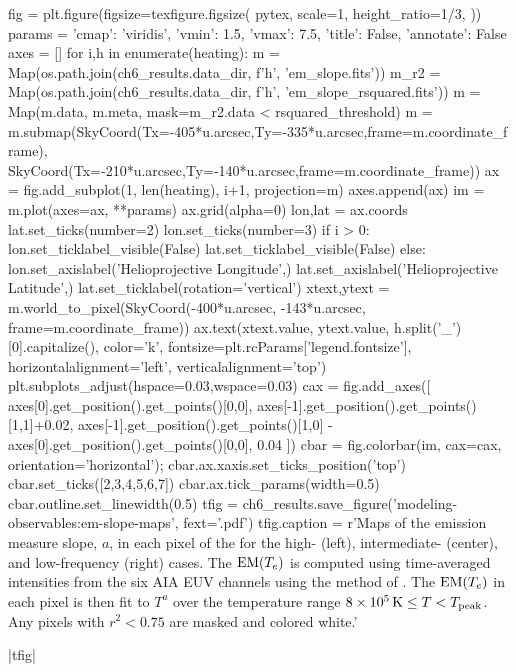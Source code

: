 \begin{pycode}
fig = plt.figure(figsize=texfigure.figsize(
    pytex,
    scale=1,
    height_ratio=1/3,
))
params = {'cmap': 'viridis', 'vmin': 1.5, 'vmax': 7.5, 'title': False, 'annotate': False}
axes = []
for i,h in enumerate(heating):
    m = Map(os.path.join(ch6_results.data_dir, f'{h}', 'em_slope.fits'))
    m_r2 = Map(os.path.join(ch6_results.data_dir, f'{h}', 'em_slope_rsquared.fits'))
    m = Map(m.data, m.meta, mask=m_r2.data < rsquared_threshold)
    m = m.submap(SkyCoord(Tx=-405*u.arcsec,Ty=-335*u.arcsec,frame=m.coordinate_frame),
                 SkyCoord(Tx=-210*u.arcsec,Ty=-140*u.arcsec,frame=m.coordinate_frame))
    ax = fig.add_subplot(1, len(heating), i+1, projection=m)
    axes.append(ax)
    im = m.plot(axes=ax, **params)
    ax.grid(alpha=0)
    lon,lat = ax.coords
    lat.set_ticks(number=2)
    lon.set_ticks(number=3)
    if i > 0:
        lon.set_ticklabel_visible(False)
        lat.set_ticklabel_visible(False)
    else:
        lon.set_axislabel('Helioprojective Longitude',)
        lat.set_axislabel('Helioprojective Latitude',)
        lat.set_ticklabel(rotation='vertical')
    xtext,ytext = m.world_to_pixel(SkyCoord(-400*u.arcsec, -143*u.arcsec, frame=m.coordinate_frame))
    ax.text(xtext.value, ytext.value, h.split('_')[0].capitalize(),
            color='k', fontsize=plt.rcParams['legend.fontsize'],
            horizontalalignment='left', verticalalignment='top')
plt.subplots_adjust(hspace=0.03,wspace=0.03)
cax = fig.add_axes([
    axes[0].get_position().get_points()[0,0],
    axes[-1].get_position().get_points()[1,1]+0.02,
    axes[-1].get_position().get_points()[1,0] - axes[0].get_position().get_points()[0,0],
    0.04
])
cbar = fig.colorbar(im, cax=cax, orientation='horizontal');
cbar.ax.xaxis.set_ticks_position('top')
cbar.set_ticks([2,3,4,5,6,7])
cbar.ax.tick_params(width=0.5)
cbar.outline.set_linewidth(0.5)
tfig = ch6_results.save_figure('modeling-observables:em-slope-maps', fext='.pdf')
tfig.caption = r'Maps of the emission measure slope, $a$, in each pixel of the \AR{} for the high- (left), intermediate- (center), and low-frequency (right) cases. The $\textup{EM}(T_e)$ is computed using time-averaged intensities from the six AIA EUV channels using the method of \citet{hannah_differential_2012}. The $\textup{EM}(T_e)$ in each pixel is then fit to $T^a$ over the temperature range $\SI{8e5}{\kelvin}\le T< T_\textup{peak}$. Any pixels with $r^2<0.75$ are masked and colored white.'
\end{pycode}
|tfig|

